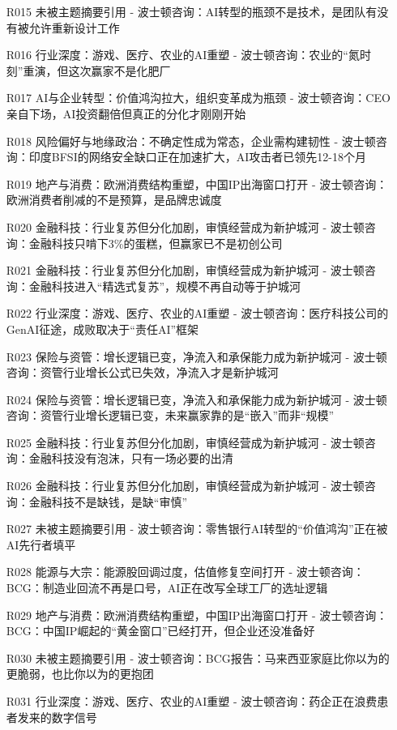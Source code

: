 \documentclass[11pt]{ctexart}
\begin{document}
\begin{itemize}
  \item [R015] 未被主题摘要引用 - 波士顿咨询：AI转型的瓶颈不是技术，是团队有没有被允许重新设计工作
  \item [R016] 行业深度：游戏、医疗、农业的AI重塑 - 波士顿咨询：农业的“氮时刻”重演，但这次赢家不是化肥厂
  \item [R017] AI与企业转型：价值鸿沟拉大，组织变革成为瓶颈 - 波士顿咨询：CEO亲自下场，AI投资翻倍但真正的分化才刚刚开始
  \item [R018] 风险偏好与地缘政治：不确定性成为常态，企业需构建韧性 - 波士顿咨询：印度BFSI的网络安全缺口正在加速扩大，AI攻击者已领先12-18个月
  \item [R019] 地产与消费：欧洲消费结构重塑，中国IP出海窗口打开 - 波士顿咨询：欧洲消费者削减的不是预算，是品牌忠诚度
  \item [R020] 金融科技：行业复苏但分化加剧，审慎经营成为新护城河 - 波士顿咨询：金融科技只啃下3\%的蛋糕，但赢家已不是初创公司
  \item [R021] 金融科技：行业复苏但分化加剧，审慎经营成为新护城河 - 波士顿咨询：金融科技进入“精选式复苏”，规模不再自动等于护城河
  \item [R022] 行业深度：游戏、医疗、农业的AI重塑 - 波士顿咨询：医疗科技公司的GenAI征途，成败取决于“责任AI”框架
  \item [R023] 保险与资管：增长逻辑已变，净流入和承保能力成为新护城河 - 波士顿咨询：资管行业增长公式已失效，净流入才是新护城河
  \item [R024] 保险与资管：增长逻辑已变，净流入和承保能力成为新护城河 - 波士顿咨询：资管行业增长逻辑已变，未来赢家靠的是“嵌入”而非“规模”
  \item [R025] 金融科技：行业复苏但分化加剧，审慎经营成为新护城河 - 波士顿咨询：金融科技没有泡沫，只有一场必要的出清
  \item [R026] 金融科技：行业复苏但分化加剧，审慎经营成为新护城河 - 波士顿咨询：金融科技不是缺钱，是缺“审慎”
  \item [R027] 未被主题摘要引用 - 波士顿咨询：零售银行AI转型的“价值鸿沟”正在被AI先行者填平
  \item [R028] 能源与大宗：能源股回调过度，估值修复空间打开 - 波士顿咨询：BCG：制造业回流不再是口号，AI正在改写全球工厂的选址逻辑
  \item [R029] 地产与消费：欧洲消费结构重塑，中国IP出海窗口打开 - 波士顿咨询：BCG：中国IP崛起的“黄金窗口”已经打开，但企业还没准备好
  \item [R030] 未被主题摘要引用 - 波士顿咨询：BCG报告：马来西亚家庭比你以为的更脆弱，也比你以为的更抱团
  \item [R031] 行业深度：游戏、医疗、农业的AI重塑 - 波士顿咨询：药企正在浪费患者发来的数字信号

\end{itemize}
\end{document}
